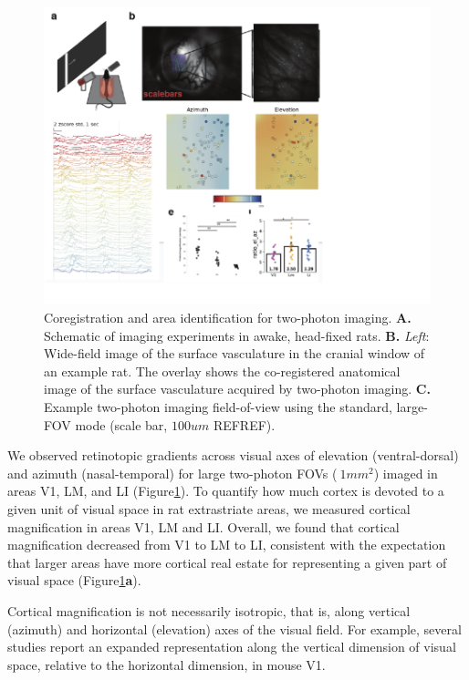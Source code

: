 \begin{figure}
    \includegraphics[width=\textwidth]{figures/chapter_3/2p_retino/2p_retino.pdf}
    \vspace{.1in}
    \caption[Identification of areas with two-photon imaging]{Coregistration and area identification for two-photon imaging. \textbf{A.} Schematic of imaging experiments in awake, head-fixed rats. \textbf{B.} \textit{Left}: Wide-field image of the surface vasculature in the cranial window of an example rat. The overlay shows the co-registered anatomical image of the surface vasculature acquired by two-photon imaging. \textbf{C.} Example two-photon imaging field-of-view using the standard, large-FOV mode (scale bar, $100um$ REFREF). 
    \label{fig:2p_retino}}
\end{figure}

We observed retinotopic gradients across visual axes of elevation (ventral-dorsal) and azimuth (nasal-temporal) for large two-photon FOVs ($~1mm^2$) imaged in areas V1, LM, and LI (Figure\ref{fig:2p_retino}). To quantify how much cortex is devoted to a given unit of visual space in rat extrastriate areas, we measured cortical magnification in areas V1, LM and LI. Overall, we found that cortical magnification decreased from V1 to LM to LI, consistent with the expectation that larger areas have more cortical real estate for representing a given part of visual space (Figure\ref{fig:2p_retino}\textbf{a}). 

Cortical magnification is not necessarily isotropic, that is, along vertical (azimuth) and horizontal (elevation) axes of the visual field. For example, several studies report an expanded representation along the vertical dimension of visual space, relative to the horizontal dimension, in mouse V1\cite{Garrett2014, Liang2018, Bonin2011}.  


